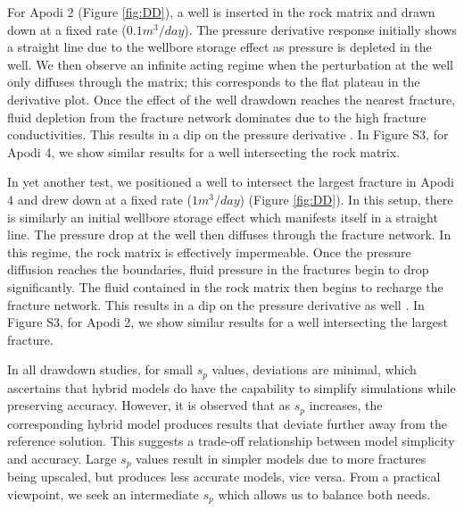 \documentclass[draft]{agujournal2018}
\begin{document}
For Apodi 2 (Figure \ref{fig:DD}), a well is inserted in the rock matrix and drawn down at a fixed rate ($0.1m^3/day$). The pressure derivative response initially shows a straight line due to the wellbore storage effect as pressure is depleted in the well. We then observe an infinite acting regime when the perturbation at the well only diffuses through the matrix; this corresponds to the flat plateau in the derivative plot. Once the effect of the well drawdown reaches the nearest fracture, fluid depletion from the fracture network dominates due to the high fracture conductivities. This results in a dip on the pressure derivative \citep{Bourdet1989, Cinco-Ley1976, Egya2018}. In Figure S3, for Apodi 4, we show similar results for a well intersecting the rock matrix.

In yet another test, we positioned a well to intersect the largest fracture in Apodi 4 and drew down at a fixed rate ($1m^3/day$) (Figure \ref{fig:DD}). In this setup, there is similarly an initial wellbore storage effect which manifests itself in a straight line. The pressure drop at the well then diffuses through the fracture network. In this regime, the rock matrix is effectively impermeable. Once the pressure diffusion reaches the boundaries, fluid pressure in the fractures begin to drop significantly. The fluid contained in the rock matrix then begins to recharge the fracture network. This results in a dip on the pressure derivative as well \citep{Gringarten1987}. In Figure S3, for Apodi 2, we show similar results for a well intersecting the largest fracture.

In all drawdown studies, for small $s_p$ values, deviations are minimal, which ascertains that hybrid models do have the capability to simplify simulations while preserving accuracy. However, it is observed that as $s_p$ increases, the corresponding hybrid model produces results that deviate further away from the reference solution. This suggests a trade-off relationship between model simplicity and accuracy. Large $s_p$ values result in simpler models due to more fractures being upscaled, but produces less accurate models, vice versa. From a practical viewpoint, we seek an intermediate $s_p$ which allows us to balance both needs. 
\end{document}
